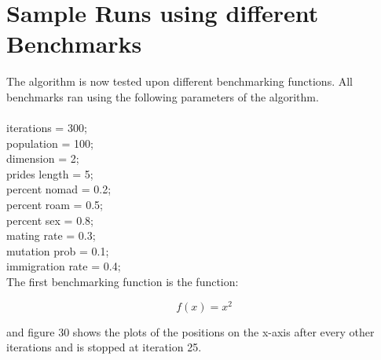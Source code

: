 \section{Sample Runs using different Benchmarks}
The algorithm is now tested upon different benchmarking functions. All benchmarks ran using the following parameters of the algorithm.
\\
\\
iterations = 300;\\

population = 100;\\

dimension = 2;\\

prides length = 5;\\

percent nomad = 0.2;\\
percent roam = 0.5;\\
percent sex = 0.8;\\

mating rate = 0.3;\\
mutation prob = 0.1;\\

immigration rate = 0.4;\\

The first benchmarking function is the function:

$$
  f(x) = x^2
$$

and figure 30 shows the plots of the positions on the x-axis after every other iterations and is stopped at iteration 25.

